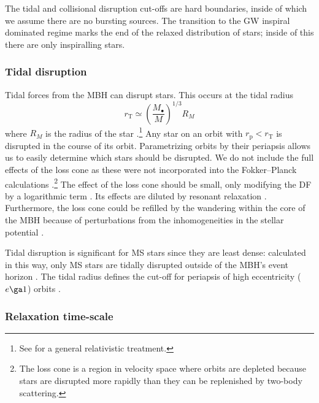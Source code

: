 \documentclass[useAMS,usedcolumn,usegraphicx,usenatbib]{mn2e}
\newcommand{\sub}[1]{\ensuremath{_\mathrm{#1}}}
\begin{document}
The tidal and collisional disruption cut-offs are hard boundaries, inside of which we assume there are no bursting sources. The transition to the GW inspiral dominated regime marks the end of the relaxed distribution of stars; inside of this there are only inspiralling stars.

\subsubsection{Tidal disruption}\label{sec:Tidal}

Tidal forces from the MBH can disrupt stars. This occurs at the tidal radius
\begin{equation}
r\sub{T} \simeq \left(\frac{M_\bullet}{M}\right)^{1/3}R_M
\label{eq:Tidal}
\end{equation}
where $R_M$ is the radius of the star \citep{Hills1975, Rees1988, Kobayashi2004}.\footnote{See \citet{Kesden2012} for a general relativistic treatment.} Any star on an orbit with $r\sub{p} < r\sub{T}$ is disrupted in the course of its orbit. Parametrizing orbits by their periapsis allows us to easily determine which stars should be disrupted. We do not include the full effects of the loss cone \citep{Frank1976, Lightman1977, Cohn1978} as these were not incorporated into the Fokker--Planck calculations \citep{Hopman2009}.\footnote{The loss cone is a region in velocity space where orbits are depleted because stars are disrupted more rapidly than they can be replenished by two-body scattering.} The effect of the loss cone should be small, only modifying the DF by a logarithmic term \citep{Lightman1977, Bahcall1977, Cohn1978}. Its effects are diluted by resonant relaxation \citep{Hopman2007,Toonen2009,Merritt2011}. Furthermore, the loss cone could be refilled by the wandering within the core of the MBH because of perturbations from the inhomogeneities in the stellar potential \citep{Sigurdsson1997,Chatterjee2002,Merritt2007}.

Tidal disruption is significant for MS stars since they are least dense: calculated in this way, only MS stars are tidally disrupted outside of the MBH's event horizon \citep{Sigurdsson1997}. The tidal radius defines the cut-off for periapsis of high eccentricity ($e \ga 1$) orbits \citep{Lightman1977}.

\subsubsection{Relaxation time-scale}\label{sec:Relax}
\end{document}
